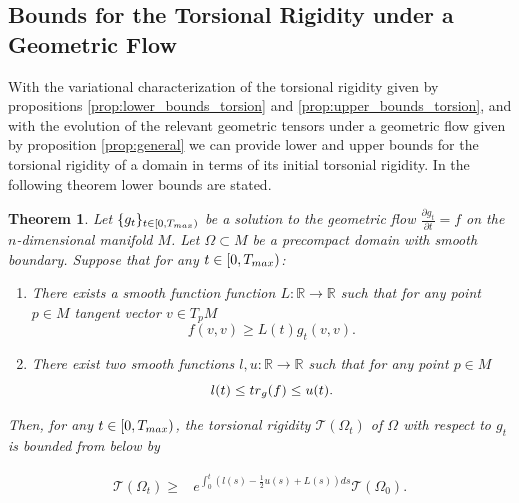 \documentclass{amsart}
\newtheorem{theorem}{Theorem}[section]
\theoremstyle{definition}
\theoremstyle{remark}
\newcommand{\tr}{{\rm tr}}
\begin{document}
\subsection{Bounds for the Torsional Rigidity under a Geometric Flow}
With the variational characterization of the torsional rigidity given by propositions \ref{prop:lower_bounds_torsion} and \ref{prop:upper_bounds_torsion}, and with the evolution of the relevant geometric tensors under a geometric flow given by proposition \ref{prop:general} we can provide lower and upper bounds for the torsional rigidity of a domain in terms of its initial torsonial rigidity.
In the following theorem lower bounds are stated.
\begin{theorem}\label{teo:lower}
    Let $\{g_t\}_{t\in [0,T_{\rm max})}$ be a solution to the geometric flow $\frac{\partial g_t}{\partial t}=f$ on the $n$-dimensional manifold $M$. Let $\Omega \subset M$ be a precompact domain with smooth boundary. Suppose that  for any $t\in [0,T_{\rm max})$:
    \begin{enumerate}
        \item There exists a smooth function function $L:\mathbb{R}\to \mathbb{R}$ such that for any point $p\in M$ tangent vector $v\in T_pM$
        $$
f(v,v)\geq L(t) g_t(v,v).
        $$
        \item There exist two smooth functions $l,u:\mathbb{R}\to\mathbb{R}$ such that for any point $p\in M$
        $$
 l(t)\leq \tr_g(f)\leq u(t).
        $$
    \end{enumerate}
    
    Then, for any $t\in [0, T_{\rm max})$, the torsional rigidity $\mathcal{T}(\Omega_t)$ of $\Omega$ with respect to $g_t$ is bounded from below by
  
$$
\begin{aligned}
    \mathcal{T}(\Omega_t)\geq&
    e^{\int_0^t\left(l(s)-\frac{1}{2}u(s)+L(s)\right)ds}\mathcal{T}(\Omega_0).
\end{aligned}
$$

\end{theorem}
\end{document}
